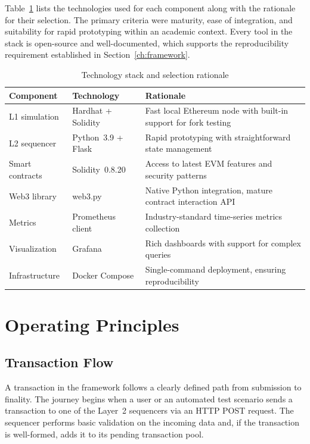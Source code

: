 Table~\ref{tab:tech-stack} lists the technologies used for each component along with the rationale for their selection. The primary criteria were maturity, ease of integration, and suitability for rapid prototyping within an academic context. Every tool in the stack is open-source and well-documented, which supports the reproducibility requirement established in Section~\ref{ch:framework}.

\begin{table}[h]
    \centering
    \begin{tabular}{l|l|p{5cm}}
        \hline
        \textbf{Component} & \textbf{Technology} & \textbf{Rationale} \\
        \hline
        L1 simulation & Hardhat + Solidity & Fast local Ethereum node with built-in support for fork testing \\
        \hline
        L2 sequencer & Python~3.9 + Flask & Rapid prototyping with straightforward state management \\
        \hline
        Smart contracts & Solidity~0.8.20 & Access to latest EVM features and security patterns \\
        \hline
        Web3 library & web3.py & Native Python integration, mature contract interaction API \\
        \hline
        Metrics & Prometheus client & Industry-standard time-series metrics collection \\
        \hline
        Visualization & Grafana & Rich dashboards with support for complex queries \\
        \hline
        Infrastructure & Docker Compose & Single-command deployment, ensuring reproducibility \\
        \hline
    \end{tabular}
    \caption{Technology stack and selection rationale}
    \label{tab:tech-stack}
\end{table}

\section{Operating Principles}

\subsection{Transaction Flow}

A transaction in the framework follows a clearly defined path from submission to finality. The journey begins when a user or an automated test scenario sends a transaction to one of the Layer~2 sequencers via an HTTP POST request. The sequencer performs basic validation on the incoming data and, if the transaction is well-formed, adds it to its pending transaction pool.

